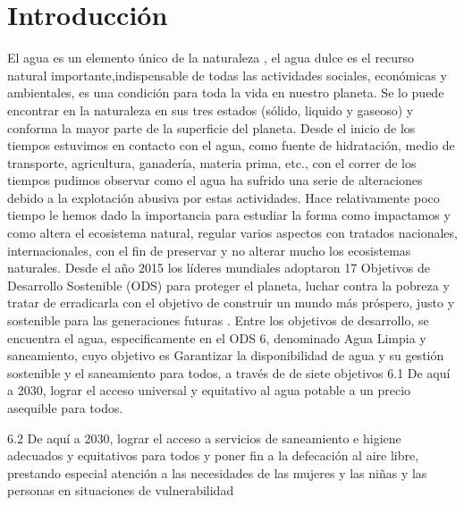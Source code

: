 

\chapter[Introducción]{Introducción}
\pagestyle{fancy}


El agua es un elemento \'unico de la naturaleza \cite{caribbean_seguridad_2020}, el agua dulce es el recurso natural importante,indispensable de todas las actividades sociales, económicas y ambientales, es una condición para toda la vida en nuestro planeta.
Se lo puede encontrar en la naturaleza en sus tres estados (sólido, liquido y gaseoso) y conforma la  mayor parte de la superficie del planeta. 
Desde el inicio de los tiempos estuvimos en contacto con el agua, como fuente de hidratación, medio de transporte, agricultura, ganadería, materia prima, etc., con el correr de los tiempos pudimos observar como el agua ha sufrido una serie de alteraciones debido a la explotación abusiva por estas actividades. 
Hace relativamente poco tiempo le hemos dado la importancia para estudiar la forma como impactamos y como altera el ecosistema natural, regular varios aspectos con tratados nacionales, internacionales, con el fin de preservar y no alterar mucho los ecosistemas naturales. 
Desde el a\~no 2015 los líderes mundiales adoptaron 17 Objetivos de Desarrollo Sostenible (ODS) para proteger el planeta, luchar contra la pobreza y tratar de erradicarla con el objetivo de construir un mundo más próspero,  justo y sostenible para las generaciones futuras \cite{bbva_que_nodate}. Entre los objetivos de desarrollo, se encuentra el agua, especificamente en el ODS 6, denominado Agua Limpia y saneamiento, cuyo objetivo es Garantizar la disponibilidad de agua y su gestión sostenible y el saneamiento para todos, a trav\'es de de siete objetivos \cite{onu_agua_nodate} 
6.1  De aquí a 2030, lograr el acceso universal y equitativo al agua potable a un precio asequible para todos.

6.2  De aquí a 2030, lograr el acceso a servicios de saneamiento e higiene adecuados y equitativos para todos y poner fin a la defecación al aire libre, prestando especial atención a las necesidades de las mujeres y las niñas y las personas en situaciones de vulnerabilidad

